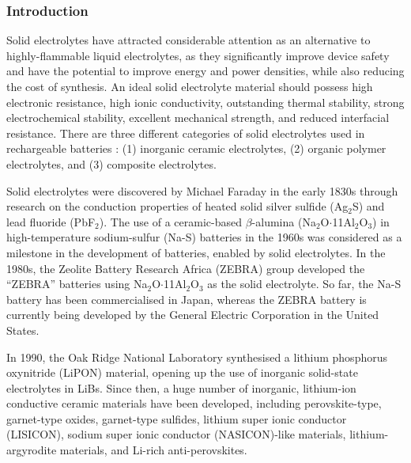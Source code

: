 \documentclass[../main.tex]{subfiles}
\begin{document}
\subsubsection{Introduction}
Solid electrolytes have attracted considerable attention as an alternative to highly-flammable liquid electrolytes, as they significantly improve device safety and have the potential to improve energy and power densities, while also reducing the cost of synthesis.\cite{janek_solid_2016, culver_designing_2018, famprikis_fundamentals_2019, goodenough_li-ion_2013, DIRICAN201927} An ideal solid electrolyte material should possess high electronic resistance, high ionic conductivity, outstanding thermal stability, strong electrochemical stability, excellent mechanical strength, and reduced interfacial resistance.\cite{han2020recent, manthiram2017} There are three different categories of solid electrolytes used in rechargeable batteries \cite{DIRICAN201927}: (1) inorganic ceramic electrolytes, (2) organic polymer electrolytes, and (3) composite electrolytes. 

Solid electrolytes were discovered by Michael Faraday in the early 1830s through research on the conduction properties of heated solid silver sulfide (Ag$_{2}$S) and lead fluoride (PbF$_{2}$).\cite{Faraday1833} The use of a ceramic-based $\beta$-alumina (Na$_{2}$O$\cdot$11Al$_{2}$O$_{3}$) in high-temperature sodium-sulfur (Na-S) batteries in the 1960s was considered as a milestone in the development of batteries, enabled by solid electrolytes.\cite{armand2008building} In the 1980s, the Zeolite Battery Research Africa (ZEBRA) group developed the ``ZEBRA'' batteries using Na$_{2}$O$\cdot$11Al$_{2}$O$_{3}$ as the solid electrolyte.\cite{ZEBRA} So far, the Na-S battery has been commercialised in Japan,\cite{oshima2004} whereas the ZEBRA battery is currently being developed by the General Electric Corporation in the United States.\cite{capasso2014} 

In 1990, the Oak Ridge National Laboratory synthesised a lithium phosphorus oxynitride (LiPON) material,\cite{dudney1992,bates1992} opening up the use of inorganic solid-state electrolytes in LiBs. Since then, a huge number of inorganic, lithium-ion conductive ceramic materials have been developed, including perovskite-type,\cite{inaguma1993} garnet-type oxides,\cite{kasper1969,mazza1988} garnet-type sulfides,\cite{kennedy1986} lithium super ionic conductor (LISICON),\cite{ivanov1988} sodium super ionic conductor (NASICON)-like materials,\cite{lang2015} lithium-argyrodite materials, \cite{deklerk2016} and Li-rich anti-perovskites.\cite{dawson2018elucidating,ahiavi2020mechanochemical}
\end{document}

